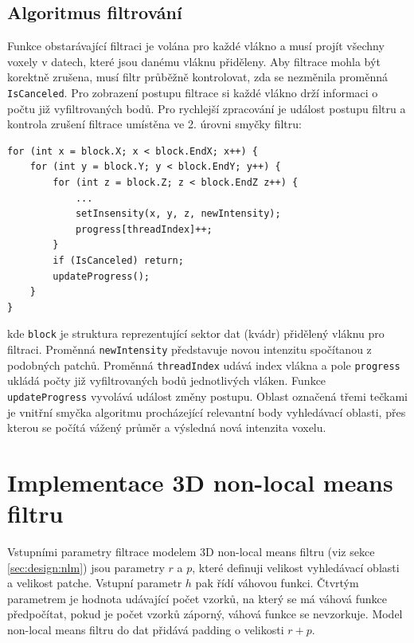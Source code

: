 \subsection*{Algoritmus filtrování}
Funkce obstarávající filtraci je volána pro každé vlákno a musí projít všechny voxely v datech, které jsou danému vláknu přiděleny. Aby filtrace mohla být korektně zrušena, musí filtr průběžně kontrolovat, zda se nezměnila proměnná \texttt{IsCanceled}. Pro zobrazení postupu filtrace si každé vlákno drží informaci o počtu již vyfiltrovaných bodů. Pro rychlejší zpracování je událost postupu filtru a kontrola zrušení filtrace umístěna ve 2. úrovni smyčky filtru:
\begin{verbatim}
for (int x = block.X; x < block.EndX; x++) {
    for (int y = block.Y; y < block.EndY; y++) {
        for (int z = block.Z; z < block.EndZ z++) {
            ...
            setInsensity(x, y, z, newIntensity);
            progress[threadIndex]++;
        }
        if (IsCanceled) return;
        updateProgress();
    }
}
\end{verbatim}
kde \texttt{block} je struktura reprezentující sektor dat (kvádr) přidělený vláknu pro filtraci. Proměnná \texttt{newIntensity} představuje novou intenzitu spočítanou z podobných patchů. Proměnná \texttt{threadIndex} udává index vlákna a pole \texttt{progress} ukládá počty již vyfiltrovaných bodů jednotlivých vláken. Funkce \texttt{updateProgress} vyvolává událost změny postupu. Oblast označená třemi tečkami je vnitřní smyčka algoritmu procházející relevantní body vyhledávací oblasti, přes kterou se počítá vážený průměr a výsledná nová intenzita voxelu.

\section{Implementace 3D non-local means filtru}
\label{sec:impl:nlm}
Vstupními parametry filtrace modelem 3D non-local means filtru (viz sekce \ref{sec:design:nlm}) jsou parametry $r$ a $p$, které definuji velikost vyhledávací oblasti a velikost patche. Vstupní parametr $h$ pak řídí váhovou funkci. Čtvrtým parametrem je hodnota udávající počet vzorků, na který se má váhová funkce předpočítat, pokud je počet vzorků záporný, váhová funkce se nevzorkuje. Model non-local means filtru do dat přidává padding o velikosti $r + p$.


